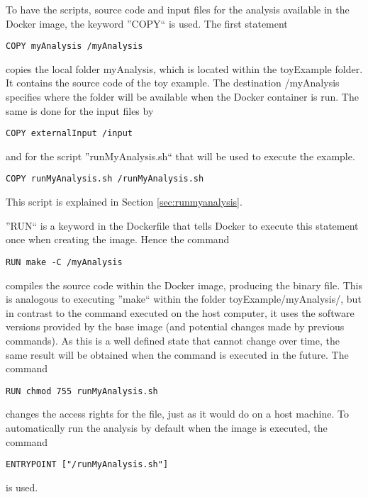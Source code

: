 \documentclass[a4paper, twoside, 11pt]{article}
\begin{document}
\label{sec:addingYourCode}
To have the scripts, source code and input files for the analysis available in the Docker image, the keyword ''COPY`` is used.
The first statement 
\begin{lstlisting}[basicstyle=\ttfamily\small,upquote=true,columns=flexible,keepspaces=true,frame=single]
COPY myAnalysis /myAnalysis
\end{lstlisting}
copies the local folder myAnalysis, which is located within the toyExample folder. 
It contains the source code of the toy example.
The destination /myAnalysis specifies where the folder will be available when the Docker container is run. 
The same is done for the input files by
\begin{lstlisting}[basicstyle=\ttfamily\small,upquote=true,columns=flexible,keepspaces=true,frame=single]
COPY externalInput /input 
\end{lstlisting}
and for the script ''runMyAnalysis.sh`` that will be used to execute the example. 
\begin{lstlisting}[basicstyle=\ttfamily\small,upquote=true,columns=flexible,keepspaces=true,frame=single]
COPY runMyAnalysis.sh /runMyAnalysis.sh
\end{lstlisting}
This script is explained in Section \ref{sec:runmyanalysis}.

''RUN`` is a keyword in the Dockerfile that tells Docker to execute this statement once when creating the image. 
Hence the command 
\begin{lstlisting}[basicstyle=\ttfamily\small,upquote=true,columns=flexible,keepspaces=true,frame=single]
RUN make -C /myAnalysis
\end{lstlisting}
compiles the source code within the Docker image, producing the binary file. 
This is analogous to executing ''make`` within the folder toyExample/myAnalysis/, 
but in contrast to the command executed on the host computer, 
it uses the software versions provided by the base image 
(and potential changes made by previous commands). 
As this is a well defined state that cannot change over time, 
the same result will be obtained when the command is executed in the future. 
The command
\begin{lstlisting}[basicstyle=\ttfamily\small,upquote=true,columns=flexible,keepspaces=true,frame=single]
RUN chmod 755 runMyAnalysis.sh
\end{lstlisting}
changes the access rights for the file, just as it would do on a host machine. 
To automatically run the analysis by default when the image is executed, the command
\begin{lstlisting}[basicstyle=\ttfamily\small,upquote=true,columns=flexible,keepspaces=true,frame=single]
ENTRYPOINT ["/runMyAnalysis.sh"]
\end{lstlisting}
is used.
\end{document}
